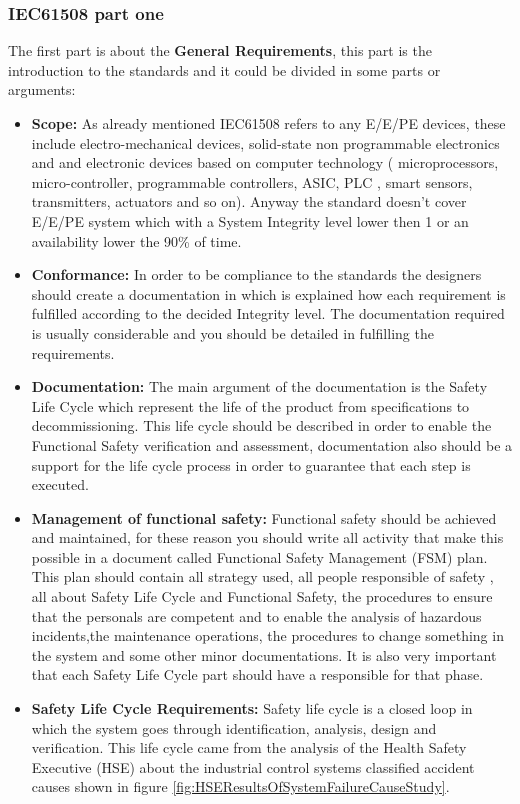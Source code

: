{{{		    \subsubsection{IEC61508 part one} {
		    The first part is about the \textbf{General Requirements}, this part is the introduction to the standards and it could be divided in some parts or arguments:
		    \begin{itemize}
		        \item \textbf{Scope:} As already mentioned IEC61508 refers to any E/E/PE devices, these include electro-mechanical devices, solid-state non programmable electronics and and electronic devices based on computer technology ( microprocessors, micro-controller, programmable controllers, ASIC, PLC , smart sensors, transmitters, actuators and so on). 
		        Anyway the standard doesn't cover E/E/PE system which with a System Integrity level lower then 1 or an availability lower the 90\% of time.
		        \item \textbf{Conformance:} In order to be compliance to the standards the designers should create a documentation in which is explained how each requirement is fulfilled according to the decided Integrity level. The documentation required is usually considerable and you should be detailed in fulfilling the requirements.
		        \item \textbf{Documentation: } The main argument of the documentation is the Safety Life Cycle which represent the life of the product from specifications to decommissioning. This life cycle should be described in order to enable the Functional Safety verification and assessment, documentation also should be a support for the life cycle process in order to guarantee that each step is executed.
		        \item \textbf{Management of functional safety: } Functional safety should be achieved and maintained, for these reason you should write all activity that make this possible in a document called Functional Safety Management (FSM) plan. This plan should contain all strategy used, all people responsible of safety , all about Safety Life Cycle and Functional Safety, the procedures to ensure that the personals are competent and to enable the analysis of hazardous incidents,the maintenance operations, the procedures to change something in the system and some other minor documentations. 
		        It is also very important that each Safety Life Cycle part should have a responsible for that phase.
		        \item \textbf{Safety Life Cycle Requirements: } Safety life cycle is a closed loop in which the system goes through identification, analysis, design and verification. This life cycle came from the analysis of the Health Safety Executive (HSE) about the industrial control systems classified accident causes shown in figure \ref{fig:HSEResultsOfSystemFailureCauseStudy}.
		        

\end{itemize}}}}}
